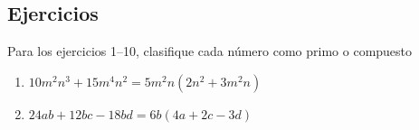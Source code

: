 \documentclass[10pt,twoside]{article}
\begin{document}
\subsection*{Ejercicios}
Para los ejercicios 1--10, clasifique cada número como primo o compuesto
\begin{enumerate}
Para los problemas 11--20, factorice cada número compuesto como producto de números primos. Por ejemplo, $30=2\cdot 3 \cdot 5$
Para los problemas 21--24, determine si el polinomio está completamente factorizado

\item $10m^{2}n^{3}+15m^{4}n^{2}=5m^{2}n(2n^{2}+3m^{2}n)$
\item $24ab+12bc-18bd=6b(4a+2c-3d)$
\end{enumerate}
\end{document}
